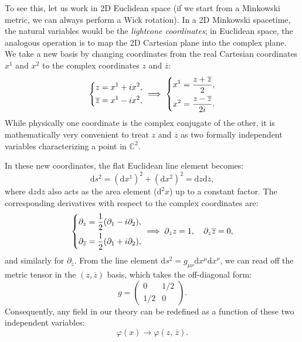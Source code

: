 To see this, let us work in 2D Euclidean space (if we start from a Minkowski metric, we can always perform a Wick rotation). In a 2D Minkowski spacetime, the natural variables would be the \textit{lightcone coordinates}; in Euclidean space, the analogous operation is to map the 2D Cartesian plane into the complex plane.
We take a new basis by changing coordinates from the real Cartesian coordinates \(x^1\) and \(x^2\) to the complex coordinates \(z\) and \(\overline{z}\):
\[
    \begin{dcases}
        z = x^1 + i x^2, \\
        \overline{z} = x^1 - i x^2,
    \end{dcases} \implies \begin{dcases}
        x^1 = \frac{z + \overline{z}}{2}, \\
        x^2 = \frac{z - \overline{z}}{2i}.
    \end{dcases}
\]
While physically one coordinate is the complex conjugate of the other, it is mathematically very convenient to treat \(z\) and \(\overline{z}\) as two formally independent variables characterizing a point in \(\mathbb{C}^2\).

In these new coordinates, the flat Euclidean line element becomes:
\[
    \mathrm{d} s^2 = (\mathrm{d} x^1)^2 + (\mathrm{d} x^2)^2 = \mathrm{d} z \mathrm{d} \overline{z},
\]
where \(\mathrm{d} z \mathrm{d} \overline{z}\) also acts as the area element (\(\mathrm{d}^2 x\)) up to a constant factor. The corresponding derivatives with respect to the complex coordinates are:
\[
    \begin{dcases}
        \partial_z = \frac{1}{2}(\partial_1 - i \partial_2), \\
        \partial_{\overline{z}} = \frac{1}{2}(\partial_1 + i \partial_2),
    \end{dcases} \implies \partial_z z = 1, \quad \partial_z \overline{z} = 0,
\]
and similarly for \(\partial_{\overline{z}}\). From the line element \(\mathrm{d}s^2 = g_{\mu\nu}\mathrm{d}x^\mu \mathrm{d}x^\nu\), we can read off the metric tensor in the \((z, \overline{z})\) basis, which takes the off-diagonal form:
\[
    g = \begin{pmatrix}
        0     & 1 / 2 \\
        1 / 2 & 0
    \end{pmatrix}.
\]
Consequently, any field in our theory can be redefined as a function of these two independent variables:
\[
    \varphi(x) \to \varphi(z, \, \overline{z}).
\]

